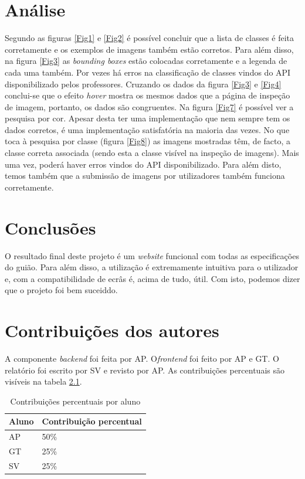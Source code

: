 \documentclass{report}
\begin{document}
\chapter{Análise}
\label{chap.analise}
Segundo as figuras \ref{Fig1} e \ref{Fig2} é possível concluir que a lista de classes é feita corretamente e os exemplos de imagens também estão corretos.
Para além disso, na figura \ref{Fig3} as \textit{bounding boxes} estão colocadas corretamente e a legenda de cada uma também. Por vezes há erros na classificação de classes vindos do API disponibilizado pelos professores.
Cruzando os dados da figura \ref{Fig3} e \ref{Fig4} conclui-se que o efeito \textit{hover} mostra os mesmos dados que a página de inspeção de imagem, portanto, os dados são congruentes.
Na figura \ref{Fig7} é possível ver a pesquisa por cor. Apesar desta ter uma implementação que nem sempre tem os dados corretos, é uma implementação satisfatória na maioria das vezes.
No que toca à pesquisa por classe (figura \ref{Fig8}) as imagens mostradas têm, de facto, a classe correta associada  (sendo esta a classe visível na inspeção de imagens). Mais uma vez, poderá haver erros vindos do API disponibilizado.
Para além disto, temos também que a submissão de imagens por utilizadores também funciona corretamente. 


\chapter{Conclusões}
\label{chap.conclusao}
O resultado final deste projeto é um \textit{website} funcional com todas as especificações do guião. Para além disso, a utilização é extremamente intuitiva para o utilizador e, com a compatibilidade de ecrâs é, acima de tudo, útil. Com isto, podemos dizer que o projeto foi bem suceiddo.

\chapter*{Contribuições dos autores}
A componente \textit{backend} foi feita por \ac{AP}. O\textit{frontend} foi feito por \ac{AP} e \ac{GT}. O relatório foi escrito por \ac{SV} e revisto por \ac{AP}.
As contribuições percentuais são visíveis na tabela \ref{tab2}.
\begin{table}[h!]
\begin{center}
\caption{Contribuições percentuais por aluno}
\begin{tabular}{l|l}
\hline
\multicolumn{1}{|l|}{Aluno} & \multicolumn{1}{l|}{Contribuição percentual} \\ \hline
            \ac{AP}   & 50\%                               \\ 
            \ac{GT}     & 25\%                               \\
            \ac{SV}         & 25\%                                
\end{tabular}
\label{tab2}
\end{center}
\end{table}
\end{document}

